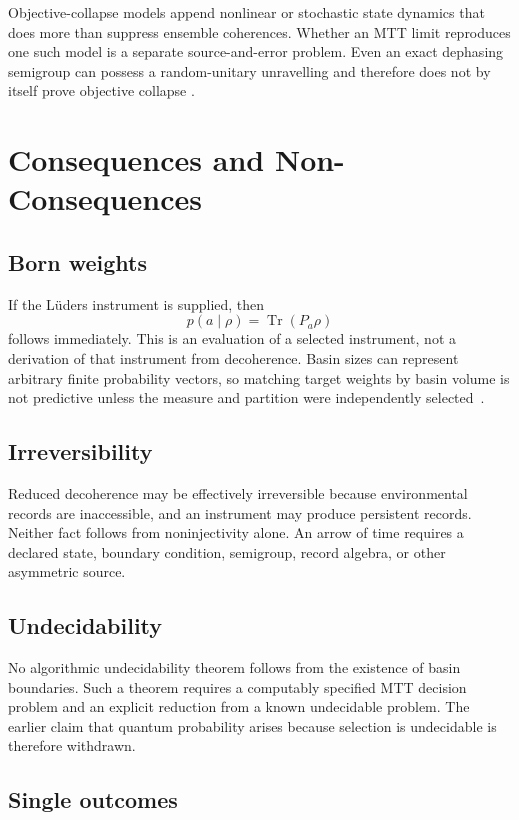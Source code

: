 \documentclass[11pt]{article}
\newcommand{\Tr}{\operatorname{Tr}}
\begin{document}
Objective-collapse models append nonlinear or stochastic state dynamics that
does more than suppress ensemble coherences.  Whether an MTT limit reproduces
one such model is a separate source-and-error problem.  Even an exact
dephasing semigroup can possess a random-unitary unravelling and therefore
does not by itself prove objective collapse
\cite{NeroGravityCollapse}.

\section{Consequences and Non-Consequences}

\subsection{Born weights}

If the L\"uders instrument is supplied, then
\[
 p(a\mid\rho)=\Tr(P_a\rho)
\]
follows immediately.  This is an evaluation of a selected instrument, not a
derivation of that instrument from decoherence.  Basin sizes can represent
arbitrary finite probability vectors, so matching target weights by basin
volume is not predictive unless the measure and partition were independently
selected~\cite{NeroProjectionProbability}.

\subsection{Irreversibility}

Reduced decoherence may be effectively irreversible because environmental
records are inaccessible, and an instrument may produce persistent records.
Neither fact follows from noninjectivity alone.  An arrow of time requires a
declared state, boundary condition, semigroup, record algebra, or other
asymmetric source.

\subsection{Undecidability}

No algorithmic undecidability theorem follows from the existence of basin
boundaries.  Such a theorem requires a computably specified MTT decision
problem and an explicit reduction from a known undecidable problem.  The
earlier claim that quantum probability arises because selection is
undecidable is therefore withdrawn.

\subsection{Single outcomes}
\end{document}
